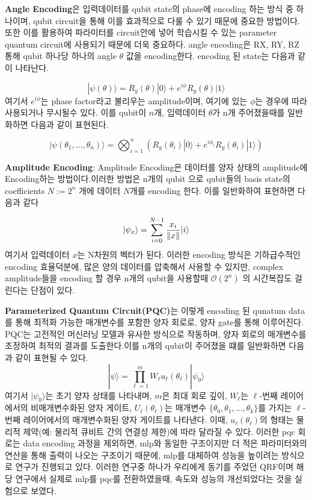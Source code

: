     \textbf{Angle Encoding}은 입력데이터를 qubit state의 phase에 encoding 하는 방식 중 하나이며, qubit circuit을 통해 이를 효과적으로 다룰 수 있기 때문에 중요한 방법이다. 또한 이를 활용하여 파라미터를 circuit안에 넣어 학습시킬 수 있는 parameter quantum circuit에 사용되기 때문에 더욱 중요하다. angle encoding은 RX, RY, RZ 통해 qubit 하나당 하나의 angle $\theta$ 값을 encoding한다. encoding 된 state는 다음과 같이 나타난다.

    \[
    |\psi(\theta)\rangle = R_y(\theta)|0\rangle + e^{i\phi}R_y(\theta)|1\rangle
    \]
    여기서 $e^{i\phi}$는 phase factor라고 불리우는 amplitude이며, 여기에 있는 $\phi$는 경우에 따라 사용되거나 무시될수 있다. 이를 qubit이 $n$개, 입력데이터 $\theta$가 n개 주어졌을때를 일반화하면 다음과 같이 표현된다.

    \[
         |\psi(\theta_1, \ldots, \theta_n)\rangle = \bigotimes_{i=1}^n (R_y(\theta_i)|0\rangle + e^{i\phi_i}R_y(\theta_i)|1\rangle)
    \]

    \clearpage
  \textbf{Amplitude Encoding}:
    Amplitude Encoding은 데이터를 양자 상태의 amplitude에 Encoding하는 방법이다.이러한 방법은 n개의 qubit 으로 qubit들의  basis state의 coefficients $N := 2^n$ 개에 데이터 $N$개를 encoding 한다. 이를  일반화하여 표현하면 다음과 같다\cite{maronese2022quantum}

    \[
    |\psi_x\rangle = \sum_{i=0}^{N-1} \frac{x_{i}}{\norm{x}} |i\rangle
    \]
    여기서 입력데이터 $x$는 N차원의 벡터가 된다. 이러한 encoding 방식은 기하급수적인 encoding 효율덕분에, 많은 양의 데이터를 압축해서 사용할 수 있지만, complex amplitude들을 encoding 할 경우 n개의 qubit을 사용할때 $\mathcal{O}(2^n)$ 의 시간복잡도 걸린다는 단점이 있다.\cite{mitsuda2024approximate}



  \textbf{Parameterized Quantum Circuit(PQC)}는 이렇게 encoding 된 qunatum data를 통해 최적화 가능한 매개변수를 포함한 양자 회로로, 양자 gate를 통해 이루어진다. PQC는 고전적인 머신러닝 모델과 유사한 방식으로 작동하며, 양자 회로의 매개변수를 조정하여 최적의 결과를 도출한다.이를 n개의 qubit이 주어졌을 떄를 일반화하면 다음과 같이 표현될 수 있다.
        \[
        |\psi\rangle = \prod_{\ell=1}^{m} W_{\ell} u_{\ell}(\theta_{\ell}) |\psi_0\rangle
        \]
        여기서 \( |\psi_0\rangle \)는 초기 양자 상태를 나타내며, \( m \)은 최대 회로 깊이, \( W_{\ell} \)는 \(\ell\)-번째 레이어에서의 비매개변수화된 양자 게이트, \( U_{\ell}(\theta_{\ell}) \)는 매개변수 \(\{\theta_0, \theta_1, \ldots, \theta_k\}\)를 가지는 \(\ell\)-번째 레이어에서의 매개변수화된 양자 게이트를 나타낸다. 이때, \( u_{\ell}(\theta_{\ell}) \)의 형태는 물리적 제약(예: 물리적 큐비트 간의 연결성 제한)에 따라 달라질 수 있다. 이러한 pqc 회로는 data encoding 과정을 제외하면, mlp와 동일한 구조이지만 더 적은 파라미터와의 연산을 통해 출력이 나오는 구조이기 때문에, mlp를 대체하여 성능을 높이려는 방식으로 연구가 진행되고 있다. 이러한 연구중 하나가 우리에게 동기를 주었던 QRF이며 해당 연구에서 실제로 mlp를 pqc를 전환하였을때, 속도와 성능의 개선되었다는 것을 실험으로 보였다.\cite{yang2022quantum}

